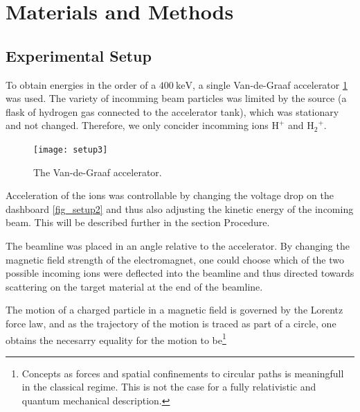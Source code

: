 \section{Materials and Methods}
\subsection{Experimental Setup}
To obtain energies in the order of a $\SI{400}{\kilo\electronvolt}$, a single
Van-de-Graaf accelerator \cref{fig_setup3} was used. The variety of incomming
beam particles was limited by the source (a flask of hydrogen gas connected to
the accelerator tank), which was stationary and not changed. Therefore, we only
concider incomming ions $\mathrm{H^+}$ and $\mathrm{{H_2}^{+}}$. 
%
\begin{figure}[t]
    \centering
    \texttt{[image: setup3]}
    \caption{The Van-de-Graaf accelerator.}
    \label{fig_setup3}
\end{figure}
%
Acceleration of the ions was controllable by changing the voltage drop on the
dashboard \cref{fig_setup2} and thus also adjusting the kinetic energy of the
incoming beam. This will be described further in the section Procedure.

The beamline was placed in an angle relative to the accelerator. By changing
the magnetic field strength of the electromagnet, one could choose which of the
two possible incoming ions were deflected into the beamline and thus directed
towards scattering on the target material at the end of the beamline.

The motion of a charged particle in a magnetic field is governed by the Lorentz
force law, and as the trajectory of the motion is traced as part of a circle,
one obtains the necesarry equality for the motion to be\footnote{Concepts as
forces and spatial confinements to circular paths is meaningfull in the
classical regime. This is not the case for a fully relativistic and quantum
mechanical description.}

